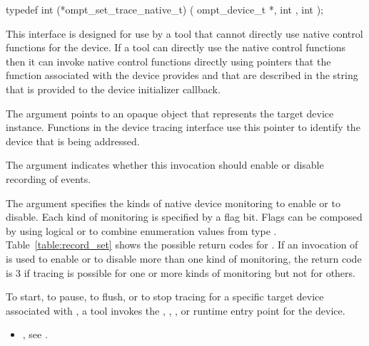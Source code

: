 \format
\begin{ccppspecific}
\begin{omptInquiry}
typedef int (*ompt_set_trace_native_t) (
  ompt_device_t *,
  int ,
  int 
);
\end{omptInquiry}
\end{ccppspecific}

\descr
This interface is designed for use by a tool that cannot directly use 
native control functions for the device. If a tool can directly use the
native control functions then it can invoke native control functions
directly using pointers that the  function associated with 
the device provides and that are described in the 
string that is provided to the device initializer callback.

\argdesc
The  argument points to an opaque object that represents
the target device instance. Functions in the device tracing interface
use this pointer to identify the device that is being addressed.

The  argument indicates whether this invocation should 
enable or disable recording of events.

The  argument specifies the kinds of native device monitoring 
to enable or to disable. Each kind of monitoring is specified by a flag bit.
Flags can be composed by using logical {\ttfamily or}  to combine enumeration
values from type . Table~\ref{table:record_set} 
shows the possible return codes for . If an 
invocation of  is used to enable or to disable 
more than one kind of monitoring, the return code is 3 if tracing is possible 
for one or more kinds of monitoring but not for others.

To start, to pause, to flush, or to stop tracing for a specific target device
associated with , a tool invokes the , 
, , or  
runtime entry point for the device.

\crossreferences
\begin{itemize}
\item {}, see .
\end{itemize}



\subsubsection{}
\label{sec:ompt_start_trace_t}

